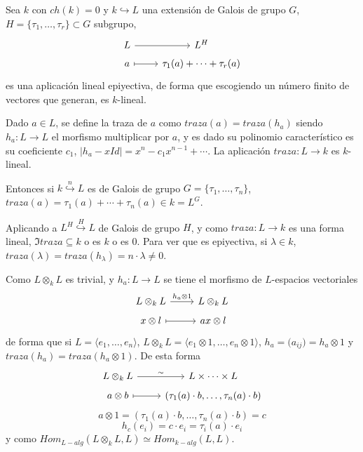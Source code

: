 \begin{prop}
    Sea $k$ con $ch(k)=0$ y $k \hookrightarrow L$ una extensi\'on de Galois de grupo $G$, $H = \{\tau_1, \ldots, \tau_r\} \subset G$ subgrupo, 
    $$\bt L \rar & L^H \\[-5mm] a \rarmaps & \tau_1(a) + \cdots + \tau_r(a)  \et$$ 
    es una aplicaci\'on lineal epiyectiva, de forma que escogiendo un n\'umero finito de vectores que generan, es $k$-lineal.
\end{prop}
\begin{defi}
Dado $a\in L$, se define la traza de $a$ como $traza(a) = traza(h_a)$ siendo $h_a: L \longrightarrow L $ el morfismo multiplicar por $a$, y es dado su polinomio caracter\'istico es su coeficiente $c_1$, $|h_a-xId| = x^n- c_1x^{n-1} + \cdots$. La aplicaci\'on $traza: L \longrightarrow k$ es $k$-lineal.
\end{defi}
Entonces si $k \overset{n}{\hookrightarrow} L$ es de Galois de grupo $G=\{\tau_1, \ldots, \tau_n\}$, $traza(a) = \tau_1(a) + \cdots + \tau_n(a) \in k = L^G$. 

Aplicando a $L^H \overset{H}{\hookrightarrow} L$ de Galois de grupo $H$, y como $traza: L \longrightarrow k$ es una forma lineal, $\Im traza \subseteq k$ o es $k$ o es 0. Para ver que es epiyectiva, si $\lambda \in k$, $traza(\lambda)=traza(h_{\lambda}) = n \cdot \lambda \neq 0$. 

Como $L\otimes_k L$ es trivial, y $h_a: L \longrightarrow L$ se tiene el morfismo de $L$-espacios vectoriales
$$\bt L\otimes_k L\rar{h_a\otimes 1} & L\otimes_k L \\[-5mm] x\otimes l \rarmaps & ax \otimes l  \et$$
de forma que si $L = \langle e_1, \ldots, e_n \rangle$, $L\otimes_k L = \langle e_1\otimes 1, \ldots, e_n \otimes 1\rangle$, $h_a= \big( a_{ij} \big) = h_a\otimes 1$ y $traza (h_a) = traza(h_a\otimes 1)$. De esta forma
$$\bt L\otimes_k L \rar{\sim} & L\times \cdots \times L  \\[-5mm]  a\otimes b \rarmaps & (\tau_1(a)\cdot b, \ldots, \tau_n(a)\cdot b) \et$$
$$a\otimes 1= (\tau_1(a)\cdot b, \ldots, \tau_n(a)\cdot b) = c$$
$$h_c(e_i) = c \cdot e_i = \tau_i(a)\cdot e_i $$
y como $Hom_{L-alg}(L\otimes_k L, L)\simeq Hom_{k-alg}(L,L)$.

